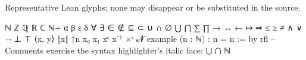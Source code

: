 Representative Lean glyphs; none may disappear or be substituted in the source.

\begin{lean}
  ℕ ℤ ℚ ℝ ℂ ℕ+ α β ε δ
  ∀ ∃ ∈ ∉ ⊆ ⊂ ∪ ∩ ∅ ⋃ ⋂ ∑ ∏
  → ↔ ← ↦ ⇒ ≤ ≥ ≠ ∧ ∨ ¬ ⊥ ⊤
  ⟨x, y⟩ ‖x‖ ↑n x₀ x₁ xᶜ x⁻¹ ×ˢ 𝓝
  example (n : ℕ) : n = n := by rfl
  -- Comments exercise the syntax highlighter's italic face: ⋃ ⋂ ℕ
\end{lean}
